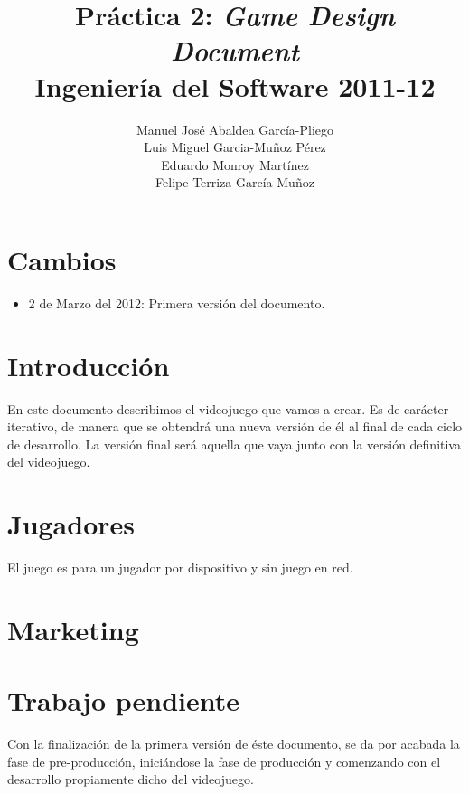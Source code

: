\documentclass[12 pt, a4paper, twoside]{article}
\title{Práctica 2: {\em Game Design Document}\\Ingeniería del Software 2011-12}
\author{Manuel José Abaldea García-Pliego\\
Luis Miguel Garcia-Muñoz Pérez\\
Eduardo Monroy Martínez\\
Felipe Terriza García-Muñoz}
\date{}
\begin{document}
\maketitle

%


\section{Cambios}

\begin{itemize}
  \item 2 de Marzo del 2012: Primera versión del documento.
\end{itemize}

\section{Introducción}

En este documento describimos el videojuego que vamos a crear. Es de carácter
iterativo, de manera que se obtendrá una nueva versión de él al final de cada
ciclo de desarrollo. La versión final será aquella que vaya junto con la
versión definitiva del videojuego.

%

\section{Jugadores}

El juego es para un jugador por dispositivo y sin juego en red.

%
%
%
%
%
%
%
%
%

\section{Marketing}



\section{Trabajo pendiente}

Con la finalización de la primera versión de éste documento, se da por acabada
la fase de pre-producción, iniciándose la fase de producción y comenzando con
el desarrollo propiamente dicho del videojuego.
\end{document}
